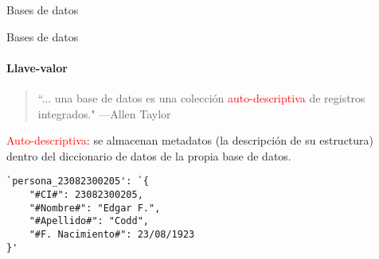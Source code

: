 \begin{frame}[fragile]{Bases de datos}
\begin{overlayarea}{\linewidth}{\textheight}
\begin{center}
\begin{minipage}{0.6\textwidth}
\end{minipage}
      \end{center}
    \end{overlayarea}

\end{frame}

\begin{frame}[fragile]{Bases de datos}
    \framesubtitle{Llave-valor}

    \begin{overlayarea}{\linewidth}{\textheight}
        \begin{onlyenv}
            \begin{block}{}
            \begin{quote}
                ``... una base de datos es una colecci\'on \textcolor{red}{auto-descriptiva} de registros integrados."
                \hspace{1em plus 1fill}---Allen Taylor
            \end{quote}
    
            \textcolor{red}{Auto-descriptiva}: se almacenan metadatos (la descripci\'on de su estructura) dentro
            del diccionario de datos de la propia base de datos.
        \end{block}
      \end{onlyenv}
      
          \vspace{5mm}
\centering

\begin{minipage}{0.6\textwidth}
\begin{lstlisting}[language=text]
`persona_23082300205': `{  
    "#CI#": 23082300205, 
    "#Nombre#": "Edgar F.", 
    "#Apellido#": "Codd", 
    "#F. Nacimiento#": 23/08/1923 
}'
\end{lstlisting}

\end{minipage}
    \end{overlayarea}

\end{frame}



